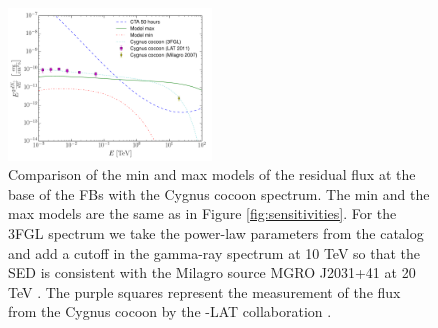 \begin{figure}[h]
\hspace{-2mm}
 \includegraphics[width=0.48\textwidth]{plots/low_lat_FB_CTA_cygnus.pdf}
 \caption{
 Comparison of the min and max models of the residual flux at the base of the FBs with the Cygnus cocoon spectrum. 
 The min and the max models are the same as in Figure \ref{fig:sensitivities}.
 For the 3FGL spectrum we take the power-law parameters from the catalog \citep{2015ApJS..218...23A}
 and add a cutoff in the gamma-ray spectrum at 10 TeV so that the SED is consistent with the Milagro source MGRO J2031+41 
 at 20 TeV \citep{2007ApJ...664L..91A}.
The purple squares represent the measurement of the flux from the Cygnus cocoon by the \Fermi-LAT collaboration
\citep{2011Sci...334.1103A}.
 }
 \label{fig:cygnus}
\end{figure}

